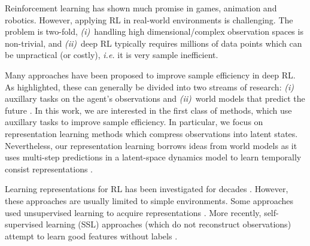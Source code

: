 \documentclass{article}
\makeatletter
\theoremstyle{plain}
\theoremstyle{definition}
\theoremstyle{remark}
\newcommand{\eg}{\textit{e.g.\@}\xspace}
\newcommand{\ie}{\textit{i.e.\@}\xspace}
\makeatother
\begin{document}
Reinforcement learning  \citep[RL, \eg][]{sutton2018reinforcement} has shown much promise in games, animation and robotics.
However, applying RL in real-world environments is challenging. The problem is two-fold,
{\em (i)}~handling high dimensional/complex observation spaces is non-trivial, and {\em (ii)}~deep RL typically requires millions of data points which can be unpractical (or costly), \ie it is very sample inefficient.

Many approaches have been proposed to improve sample efficiency in deep RL.
As \citet{laskinCURLContrastiveUnsupervised2020} highlighted, these can generally be divided into two streams of research:
{\em (i)} auxillary tasks on the agent's observations and {\em (ii)}~world models that predict the future
\citep{haRecurrentWorldModels2018,hafnerLearning2019,hansenTemporalDifferenceLearning2022}.
In this work, we are interested in the first class of methods, which use auxillary tasks to improve sample efficiency.
In particular, we focus on representation learning methods which compress observations into latent states.
Nevertheless, our representation learning borrows ideas from world models as it uses multi-step predictions in a
latent-space dynamics model to learn temporally consist representations \citep{zhaoSimplifiedTemporalConsistency2023}.

Learning representations for RL has been investigated for decades
\citep{abelOptimalBehaviorApproximate2016,mannorDynamicAbstractionReinforcement2004,liUnifiedTheoryState2006,andreStateAbstractionProgrammable2002,deardenAbstractionApproximateDecisiontheoretic1997,singhReinforcementLearningSoft1994,higginsDefinitionDisentangledRepresentations2018,vanhoofStableReinforcementLearning2016,watterEmbedControlLocally2015,ghoshRepresentationsStableOffPolicy2020}.
However, these approaches are usually limited to simple environments.
Some approaches used unsupervised learning \citep[\eg\ VAE,][with reconstruction loss]{kingmaAutoEncoding2014} to acquire representations
\citep{finnDeepSpatialAutoencoders2016,higginsDARLAImprovingZeroShot2017,langeAutonomousReinforcementLearning2012,watterEmbedControlLocally2015}.
More recently, self-supervised learning (SSL) approaches (which do not reconstruct observations)
attempt to learn good features without labels \cite{anandUnsupervisedStateRepresentation2019}.
\end{document}
